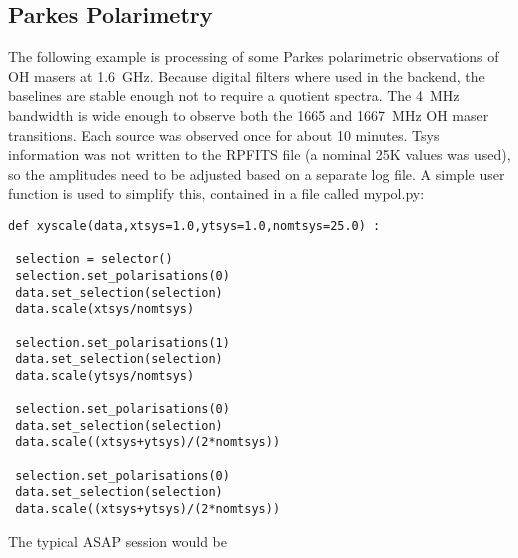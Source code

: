 \documentclass[11pt]{article}
\begin{document}
\subsection{Parkes Polarimetry}

The following example is processing
of some Parkes polarimetric observations of OH masers at
1.6~GHz. Because digital filters where used in the backend, the
baselines are stable enough not to require a quotient spectra. The
4~MHz bandwidth is wide enough to observe both the 1665 and 1667~MHz
OH maser transitions. Each source was observed once for about 10
minutes. Tsys information was not written to the RPFITS file (a
nominal 25K values was used), so the amplitudes need to be adjusted
based on a separate log file. A simple user function is used to
simplify this, contained in a file called mypol.py:

\begin{verbatim}
def xyscale(data,xtsys=1.0,ytsys=1.0,nomtsys=25.0) :

 selection = selector()
 selection.set_polarisations(0)
 data.set_selection(selection)
 data.scale(xtsys/nomtsys)

 selection.set_polarisations(1)
 data.set_selection(selection)
 data.scale(ytsys/nomtsys)

 selection.set_polarisations(0)
 data.set_selection(selection)
 data.scale((xtsys+ytsys)/(2*nomtsys))

 selection.set_polarisations(0)
 data.set_selection(selection)
 data.scale((xtsys+ytsys)/(2*nomtsys))
\end{verbatim}

The typical ASAP session would be
\end{document}
